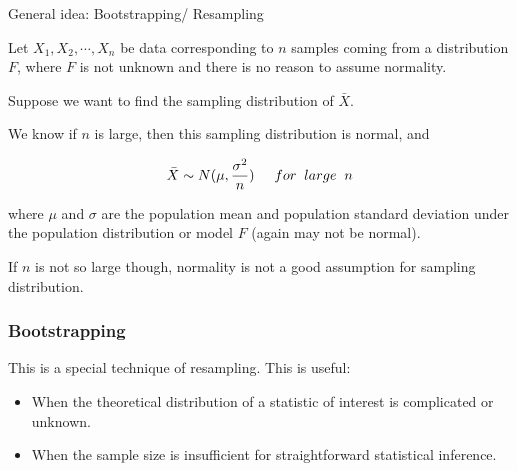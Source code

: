 \documentclass{beamer}\usepackage[]{graphicx}\usepackage[]{color}
\begin{document}
\begin{frame}{General idea: Bootstrapping/ Resampling}

Let $X_1, X_2, \cdots, X_{n}$ be data corresponding to $n$ samples coming from a distribution $F$, where $F$ is not unknown and there is no reason to assume normality.\pause \newline

Suppose we want to find the sampling distribution of $\bar{X}$.  \pause \newline

We know if $n$ is large, then this sampling distribution is normal, and

$$ \bar{X} \sim N(\mu, \frac{\sigma^2}{n})  \hspace{0.5 cm} for \;\; large \;\; n$$

where $\mu$ and $\sigma$ are the population mean and population standard deviation under the population distribution or model $F$ (again may not be normal). \pause \newline

If $n$ is not so large though, normality is not a good assumption for sampling distribution.

\end{frame}

\begin{frame}

\frametitle{Bootstrapping}

This is a special technique of resampling. \pause This is useful:

\begin{itemize}
\item When the theoretical distribution of a statistic of interest is complicated or unknown. \pause
\item When the sample size is insufficient for straightforward statistical inference. \pause
\end{itemize}

\end{frame}
\end{document}
